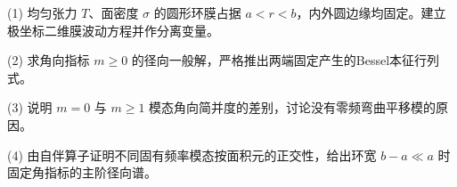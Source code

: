 (1) 均匀张力 \(T\)、面密度 \(\sigma\) 的圆形环膜占据 \(a<r<b\)，内外圆边缘均固定。建立极坐标二维膜波动方程并作分离变量。

(2) 求角向指标 \(m\ge0\) 的径向一般解，严格推出两端固定产生的Bessel本征行列式。

(3) 说明 \(m=0\) 与 \(m\ge1\) 模态角向简并度的差别，讨论没有零频弯曲平移模的原因。

(4) 由自伴算子证明不同固有频率模态按面积元的正交性，给出环宽 \(b-a\ll a\) 时固定角指标的主阶径向谱。
